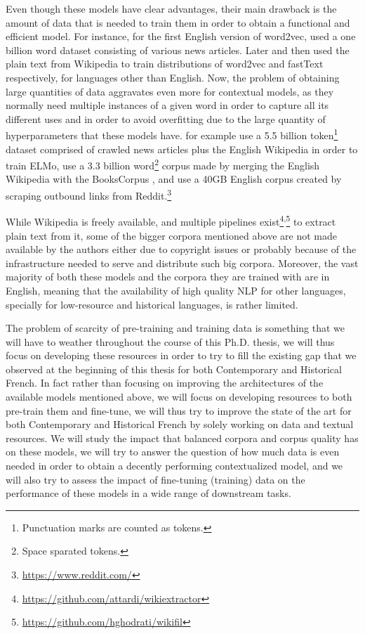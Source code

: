 Even though these models have clear advantages, their main drawback is the amount of data that is needed to train them in order to obtain a functional and efficient model. For instance, for the first English version of word2vec, \citet{mikolov-etal-2013-distributed} used a one billion word dataset consisting of various news articles. Later \citet{al-rfou-etal-2013-polyglot} and then \citet{bojanowski-etal-2017-enriching} used the plain text from Wikipedia to train distributions of word2vec and fastText respectively, for languages other than English. Now, the problem of obtaining large quantities of data aggravates even more for contextual models, as they normally need multiple instances of a given word in order to capture all its different uses and in order to avoid overfitting due to the large quantity of hyperparameters that these models have. \citet{peters-etal-2018-deep} for example use a 5.5 billion token\footnote{Punctuation marks are counted as tokens.} dataset comprised of crawled news articles plus the English Wikipedia in order to train ELMo, \citet{devlin-etal-2019-bert} use a 3.3 billion word\footnote{Space sparated tokens.} corpus made by merging the English Wikipedia with the BooksCorpus \citep{zhu-etal-2015-aligning}, and \citet{radford-etal-2019-language} use a 40GB English corpus created by scraping outbound links from Reddit.\footnote{\url{https://www.reddit.com/}}

While Wikipedia is freely available, and multiple pipelines exist\footnote{\url{https://github.com/attardi/wikiextractor}}\textsuperscript{,}\footnote{\url{https://github.com/hghodrati/wikifil}} to extract plain text from it, some of the bigger corpora mentioned above are not made available by the authors either due to copyright issues or probably because of the infrastructure needed to serve and distribute such big corpora. Moreover, the vast majority of both these models and the corpora they are trained with are in English, meaning that the availability of high quality NLP for other languages, specially for low-resource and historical languages, is rather limited.

The problem of scarcity of pre-training and training data is something that we will have to weather throughout the course of this Ph.D. thesis, we will thus focus on developing these resources in order to try to fill the existing gap that we observed at the beginning of this thesis for both Contemporary and Historical French. In fact rather than focusing on improving the architectures of the available models mentioned above, we will focus on developing resources to both pre-train them and fine-tune, we will thus try to improve the state of the art for both Contemporary and Historical French by solely working on data and textual resources. We will study the impact that balanced corpora and corpus quality has on these models, we will try to answer the question of how much data is even needed in order to obtain a decently performing contextualized model, and we will also try to assess the impact of fine-tuning (training) data on the performance of these models in a wide range of downstream tasks.

